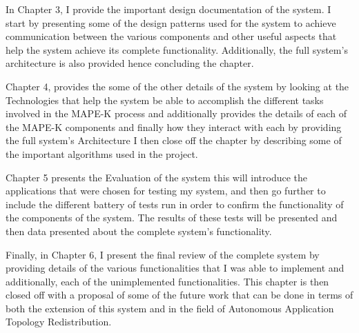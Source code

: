In Chapter 3, I provide the important design documentation of the system. I start by presenting some of the design patterns used for the system to achieve communication between the various components and other useful aspects that help the system achieve its complete functionality. Additionally, the full system's architecture is also provided hence concluding the chapter.

Chapter 4, provides the some of the other details of the system by looking at the Technologies that help the system be able to accomplish the different tasks involved in the MAPE-K process and additionally provides the details of each of the MAPE-K components and finally how they interact with each by providing the full system's Architecture I then close off the chapter by describing some of the important algorithms used in the project.

Chapter 5 presents the Evaluation of the system this will introduce the applications that were chosen for testing my system, and then go further to include the different battery of tests run in order to confirm the functionality of the components of the system. The results of these tests will be presented and then data presented about the complete system's functionality.

Finally, in Chapter 6, I present the final review of the complete system by providing details of the various functionalities that I was able to implement and additionally, each of the unimplemented functionalities. This chapter is then closed off with a proposal of some of the future work that can be done in terms of both the extension of this system and in the field of Autonomous Application Topology Redistribution.


\clearpage




